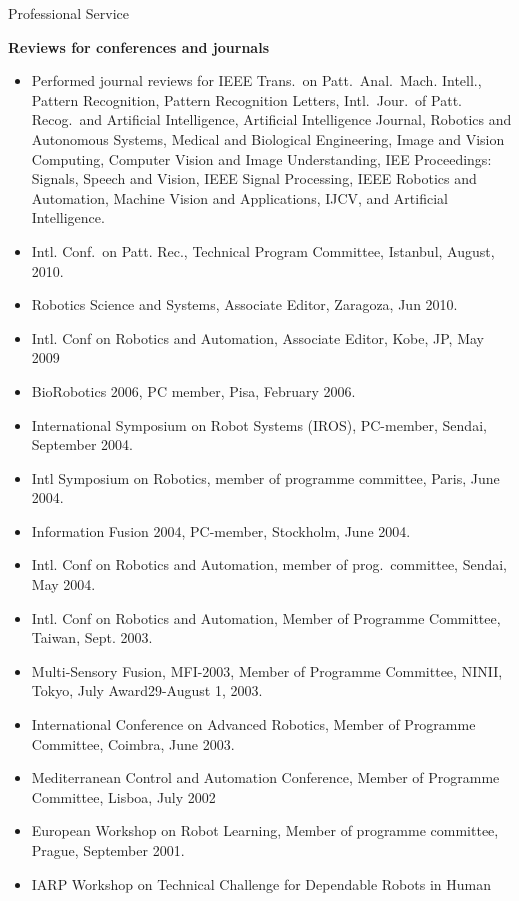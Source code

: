 \documentclass{article}
\begin{document}
\begin{cv}
\begin{cvlist}{Professional Service}
		\item {\bf Reviews for conferences and journals}
		\begin{itemize}
			\item Performed journal reviews for IEEE Trans.\ on Patt.\ Anal.\ Mach. Intell.,
			      Pattern Recognition, Pattern Recognition Letters, Intl.\ Jour.\ of Patt.\@
			      Recog.\ and Artificial Intelligence, Artificial Intelligence Journal,
			      Robotics and Autonomous Systems, Medical and Biological Engineering,
			      Image and Vision Computing, Computer Vision and Image Understanding,
			      IEE Proceedings: Signals, Speech and Vision, IEEE Signal Processing,
			      IEEE Robotics and Automation, Machine Vision and Applications, IJCV,
			      and Artificial Intelligence.
			\item Intl. Conf.\ on Patt. Rec., Technical Program Committee, Istanbul,
			      August, 2010.
			\item Robotics Science and Systems, Associate Editor, Zaragoza, Jun 2010.
			\item Intl. Conf on Robotics and Automation, Associate Editor, Kobe, JP, May
			      2009
			\item BioRobotics 2006, PC member, Pisa, February 2006.
			\item International Symposium on Robot Systems (IROS), PC-member, Sendai,
			      September 2004.
			\item Intl Symposium on Robotics, member of programme committee, Paris, June
			      2004.
			\item Information Fusion 2004, PC-member, Stockholm, June 2004.
			\item Intl. Conf on Robotics and Automation, member of prog.\ committee, Sendai,
			      May 2004.
			\item Intl. Conf on Robotics and Automation, Member of Programme Committee,
			      Taiwan, Sept. 2003.
			\item Multi-Sensory Fusion, MFI-2003, Member of Programme Committee, NINII,
			      Tokyo, July Award29-August 1, 2003.
			\item International Conference on Advanced Robotics, Member of Programme
			      Committee, Coimbra, June 2003.
			\item Mediterranean Control and Automation Conference, Member of Programme
			      Committee, Lisboa, July 2002
			\item European Workshop on Robot Learning, Member of programme committee,
			      Prague, September 2001.
			\item IARP Workshop on Technical Challenge for Dependable Robots in Human

\end{itemize}
\end{cvlist}
\end{cv}
\end{document}
